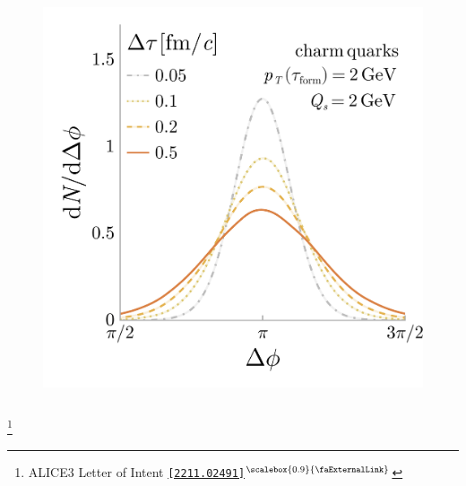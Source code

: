 \documentclass[aspectratio=169,11pt,usenames,dvipsnames]{beamer}
\renewcommand{\thefootnote}{}
\newcommand\blfootnote[1]{%
  \begingroup
  \renewcommand\thefootnote{}\footnote{#1}%
  \addtocounter{footnote}{-1}%
  \endgroup
}
\begin{document}
\begin{frame}[noframenumbering]
\begin{center}
\begin{columns}[onlytextwidth,t]
\begin{center}
                \vspace{-10pt}
                \begin{figure}
                    \centering
                    \includegraphics[width=0.8\columnwidth]{images/final_dNdphi_tau_dep_charm_v2.png}
                \end{figure}
            \end{center}
        \end{columns}    

    \end{center}
    \vspace{-10pt}
    \blfootnote{\scriptsize ALICE3 Letter of Intent \href{https://arxiv.org/abs/2211.02491}{{\color{palgold}\texttt{[2211.02491]$^\text{\scalebox{0.9}{\faExternalLink}}$}}}}
\end{frame}
\end{document}
